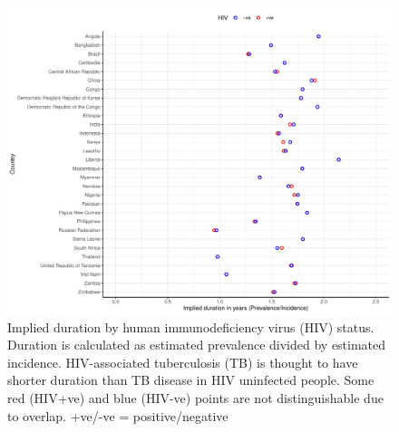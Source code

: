 \documentclass[12pt]{article}
\begin{document}
\begin{figure}
  \centering
  \includegraphics[width=1\textwidth]{../plots/aF7.pdf}
  \caption[Implied duration by HIV status]{Implied duration by human
    immunodeficiency virus (HIV) status.
    Duration is calculated as estimated prevalence divided by estimated
    incidence. HIV-associated tuberculosis (TB) is thought to have shorter duration than TB
    disease in HIV uninfected people. Some red (HIV+ve) and blue (HIV-ve) points are not
    distinguishable due to overlap. +ve/-ve = positive/negative}
\end{figure}


\FloatBarrier
\end{document}
